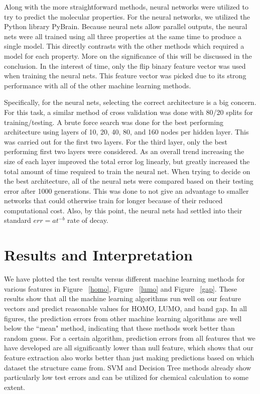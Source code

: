 \documentclass[10pt, oneside]{article}   	%
\begin{document}
Along with the more straightforward methods, neural networks were utilized to try to predict the molecular properties. For the neural networks, we utilized the Python library PyBrain\cite{pybrain}. Because neural nets allow parallel outputs, the neural nets were all trained using all three properties at the same time to produce a single model. This directly contrasts with the other methods which required a model for each property. More on the significance of this will be discussed in the conclusion. In the interest of time, only the flip binary feature vector was used when training the neural nets. This feature vector was picked due to its strong performance with all of the other machine learning methods.

Specifically, for the neural nets, selecting the correct architecture is a big concern. For this task, a similar method of cross validation was done with 80/20 splits for training/testing. A brute force search was done for the best performing architecture using layers of 10, 20, 40, 80, and 160 nodes per hidden layer. This was carried out for the first two layers. For the third layer, only the best performing first two layers were considered. As an overall trend increasing the size of each layer improved the total error log linearly, but greatly increased the total amount of time required to train the neural net. When trying to decide on the best architecture, all of the neural nets were compared based on their testing error after 1000 generations. This was done to not give an advantage to smaller networks that could otherwise train for longer because of their reduced computational cost. Also, by this point, the neural nets had settled into their standard $err = a t^{-b} $ rate of decay.



\section{Results and Interpretation}

\noindent We have plotted the test results versus different machine learning methods for various features in Figure ~\ref{homo}, Figure ~\ref{lumo} and Figure ~\ref{gap}. These results show that all the machine learning algorithms run well on our feature vectors and predict reasonable values for HOMO, LUMO, and band gap. In all figures, the prediction errors from other machine learning algorithms are well below the ``mean" method, indicating that these methods work better than random guess. For a certain algorithm, prediction errors from all features that we have developed are all significantly lower than null feature, which shows that our feature extraction also works better than just making predictions based on which dataset the structure came from. SVM and Decision Tree methods already show particularly low test errors and can be utilized for chemical calculation to some extent.
\end{document}
